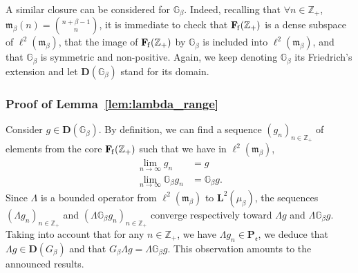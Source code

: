 \documentclass[10pt]{amsart}
\theoremstyle{definition}\newtheorem{defi}[theo]{Definition}\newtheorem{rema}[theo]{Remark}\newtheorem{exam}[theo]{Example}\newtheorem{exem}[theo]{Example}\newtheorem{nota}[theo]{Notation}
\newcommand{\ZZ}{\mathbb{Z}}
\newcommand{\fe}{\mathfrak{e}}
\newcommand{\fm}{\mathfrak{m}}
\newcommand{\iy}{\infty}
\newcommand{\ri}{\rightarrow}
\newcommand{\dBg}{{\discret{G}}}
\newcommand{\Bg}{G}
\newcommand{\esP}{\mathbf{P}}
\newcommand{\esD}{\mathbf{D}}
\newcommand{\esL}{\mathbf{L}}
\newcommand{\esLd}{\ell}
\newcommand{\esF}{\mathbf{F}}
\newcommand{\esPe}{\esP_{\! \fe}}
\newcommand{\esFf}{\esF_{\hskip-.3mm\mathrm{f}}}
\newcommand{\discret}[1]{\mathds{#1}}
\let\oldforall\forall
\renewcommand*{\forall}{\mathrel{\oldforall}}
\begin{document}
A similar closure can be considered for $\dBg_{\beta}$. Indeed, recalling that $
\forall n\in\ZZ_+$, $\fm_{\beta}(n)=\binom{n+\beta-1}{n}$, it is immediate to check that $\esFf(\ZZ_+)$ is a dense subspace of $\esLd^2(\fm_{\beta})$, that the image of $\esFf(\ZZ_+)$ by $\dBg_{\beta}$ is included into $\esLd^2(\fm_{\beta})$, and that $\dBg_{\beta}$ is symmetric and non-positive. Again, we keep denoting $\dBg_{\beta}$ its Friedrich's extension and let $\esD(\dBg_{\beta})$ stand for its domain.

\subsubsection{Proof of Lemma~\ref{lem:lambda_range}}

Consider $g\in\esD(\dBg_{\beta})$. By definition, we can find a sequence $(g_n)_{n\in\ZZ_+}$ of elements from the core $\esFf(\ZZ_+)$ such that we have in $\esLd^2(\fm_{\beta})$,
\begin{align*}
\lim_{n\ri\iy} g_n&=g\\
\lim_{n\ri\iy} \dBg_{\beta} g_n &=\dBg_{\beta} g.
\end{align*}
Since $\Lambda$ is a bounded operator from $\esLd^2(\fm_{\beta})$ to $\esL^2(\mu_{\beta})$, the sequences $(\Lambda g_n)_{n\in\ZZ_+}$ and $(\Lambda \dBg_{\beta} g_n)_{n\in\ZZ_+}$ converge respectively toward $\Lambda g $ and $\Lambda \dBg_{\beta} g $. Taking into account that for any $n\in\ZZ_+$, we have $\Lambda g_{n} \in\esPe$, we deduce that $\Lambda g\in\esD(\Bg_{\beta})$ and that $\Bg_{\beta}\Lambda g=\Lambda \dBg_{\beta} g$. This observation amounts to the announced results.
\end{document}
